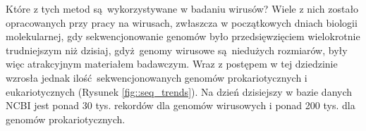 \documentclass[two column, twoside, a4paper]{article}
\begin{document}
Które z tych metod są wykorzystywane w badaniu wirusów? Wiele z nich zostało opracowanych przy pracy na wirusach, zwłaszcza w początkowych dniach biologii molekularnej, gdy sekwencjonowanie genomów było przedsięwzięciem wielokrotnie trudniejszym niż dzisiaj, gdyż genomy wirusowe są niedużych rozmiarów, były więc atrakcyjnym materiałem badawczym. Wraz z postępem w tej dziedzinie wzrosła jednak ilość sekwencjonowanych genomów prokariotycznych i eukariotycznych (Rysunek \ref{fig::seq_trends}). Na dzień dzisiejszy w bazie danych NCBI jest ponad 30 tys. rekordów dla genomów wirusowych i ponad 200 tys. dla genomów prokariotycznych.

\printbibliography
\end{document}
